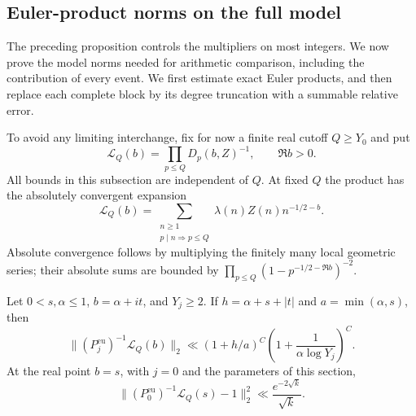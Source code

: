 \subsection{Euler-product norms on the full model}

The preceding proposition controls the multipliers on most integers.
We now prove the model norms needed for arithmetic comparison, including
the contribution of every event. We first estimate exact Euler products,
and then replace each complete block by its degree truncation with a
summable relative error.

To avoid any limiting interchange, fix for now a finite real cutoff
$Q\ge Y_0$ and put
\begin{equation}
 \mathcal L_Q(b)=\prod_{p\le Q}D_p(b,Z)^{-1},\qquad \Re b>0.
 \label{model:finite-Euler}
\end{equation}
All bounds in this subsection are independent of $Q$.  At fixed $Q$
the product has the absolutely convergent expansion
\begin{equation}
 \mathcal L_Q(b)=
 \sum_{\substack{n\ge1\\p\mid n\Rightarrow p\le Q}}
       \lambda(n)Z(n)n^{-1/2-b}.
 \label{model:finite-expansion}
\end{equation}
Absolute convergence follows by multiplying the finitely many local
geometric series; their absolute sums are bounded by
$\prod_{p\le Q}(1-p^{-1/2-\Re b})^{-2}$.

\begin{lemma}\label{model:exact-shifts}
Let $0<s,\alpha\le1$, $b=\alpha+it$, and $Y_j\ge2$.  If
$h=\alpha+s+|t|$ and $a=\min(\alpha,s)$, then
\begin{equation}
 \|(P_j^{\mathrm{eu}})^{-1}\mathcal L_Q(b)\|_2
 \ll (1+h/a)^C
       \left(1+\frac1{\alpha\log Y_j}\right)^C.
 \label{model:general-exact-norm}
\end{equation}
At the real point $b=s$, with $j=0$ and the parameters of this section,
\begin{equation}
 \|(P_0^{\mathrm{eu}})^{-1}\mathcal L_Q(s)-1\|_2^2
 \ll \frac{e^{-2\sqrt k}}{\sqrt k}.
 \label{model:exact-distance}
\end{equation}
\end{lemma}

